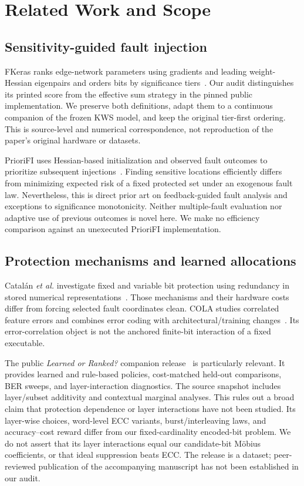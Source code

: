 \section{Related Work and Scope}\label{sec:related}
\subsection{Sensitivity-guided fault injection}
FKeras ranks edge-network parameters using gradients and leading weight-Hessian eigenpairs and orders bits by significance tiers~\cite{weng2024fkeras}. Our audit distinguishes its printed score from the effective sum strategy in the pinned public implementation. We preserve both definitions, adapt them to a continuous companion of the frozen KWS model, and keep the original tier-first ordering. This is source-level and numerical correspondence, not reproduction of the paper's original hardware or datasets.

PrioriFI uses Hessian-based initialization and observed fault outcomes to prioritize subsequent injections~\cite{weng2026priorifi}. Finding sensitive locations efficiently differs from minimizing expected risk of a fixed protected set under an exogenous fault law. Nevertheless, this is direct prior art on feedback-guided fault analysis and exceptions to significance monotonicity. Neither multiple-fault evaluation nor adaptive use of previous outcomes is novel here. We make no efficiency comparison against an unexecuted PrioriFI implementation.

\subsection{Protection mechanisms and learned allocations}
Catal\'an \emph{et al.} investigate fixed and variable bit protection using redundancy in stored numerical representations~\cite{catalan2025redundancy}. Those mechanisms and their hardware costs differ from forcing selected fault coordinates clean. COLA studies correlated feature errors and combines error coding with architectural/training changes~\cite{yu2023cola}. Its error-correlation object is not the anchored finite-bit interaction of a fixed executable.

The public \emph{Learned or Ranked?} companion release~\cite{alobaidi2026selectiveeccdataset} is particularly relevant. It provides learned and rule-based policies, cost-matched held-out comparisons, BER sweeps, and layer-interaction diagnostics. The source snapshot includes layer/subset additivity and contextual marginal analyses. This rules out a broad claim that protection dependence or layer interactions have not been studied. Its layer-wise choices, word-level ECC variants, burst/interleaving laws, and accuracy--cost reward differ from our fixed-cardinality encoded-bit problem. We do not assert that its layer interactions equal our candidate-bit M\"obius coefficients, or that ideal suppression beats ECC. The release is a dataset; peer-reviewed publication of the accompanying manuscript has not been established in our audit.

